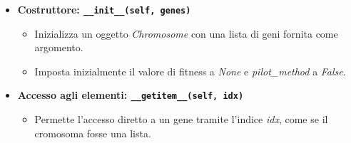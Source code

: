 \begin{itemize}
    \item \textbf{Costruttore: \texttt{\_\_init\_\_(self, genes)}}
    \begin{itemize}
        \item Inizializza un oggetto \emph{Chromosome} con una lista di geni fornita come argomento.
        \item Imposta inizialmente il valore di fitness a \emph{None} e \emph{pilot\_method} a \emph{False}.
    \end{itemize}




    \item \textbf{Accesso agli elementi: \texttt{\_\_getitem\_\_(self, idx)}}
    \begin{itemize}
        \item Permette l'accesso diretto a un gene tramite l'indice \emph{idx}, come se il cromosoma fosse una lista.
    \end{itemize}




\end{itemize}
